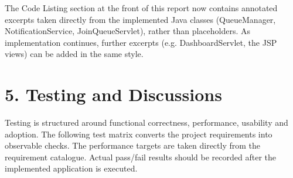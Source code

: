 \documentclass[
]{article}
\begin{document}
The Code Listing section at the front of this report now contains
annotated excerpts taken directly from the implemented Java classes
(QueueManager, NotificationService, JoinQueueServlet), rather than
placeholders. As implementation continues, further excerpts (e.g.
DashboardServlet, the JSP views) can be added in the same style.

\section{5. Testing and Discussions}\label{testing-and-discussions}

Testing is structured around functional correctness, performance,
usability and adoption. The following test matrix converts the project
requirements into observable checks. The performance targets are taken
directly from the requirement catalogue. Actual pass/fail results should
be recorded after the implemented application is executed.
\end{document}
